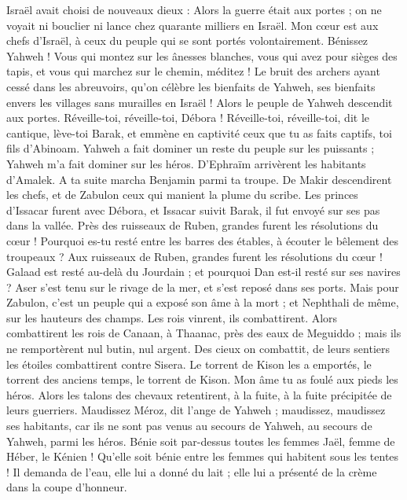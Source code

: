 \begin{multicols}{2}
Israël avait choisi de nouveaux dieux : Alors la guerre était aux portes ; on ne voyait ni bouclier ni lance chez quarante milliers en Israël.
Mon cœur est aux chefs d'Israël, à ceux du peuple qui se sont portés volontairement. Bénissez Yahweh !
Vous qui montez sur les ânesses blanches, vous qui avez pour sièges des tapis, et vous qui marchez sur le chemin, méditez !
Le bruit des archers ayant cessé dans les abreuvoirs, qu'on célèbre les bienfaits de Yahweh, ses bienfaits envers les villages sans murailles en Israël ! Alors le peuple de Yahweh descendit aux portes.
Réveille-toi, réveille-toi, Débora !  Réveille-toi, réveille-toi, dit le cantique, lève-toi Barak, et emmène en captivité ceux que tu as faits captifs, toi fils d'Abinoam.
Yahweh a fait dominer un reste du peuple sur les puissants ; Yahweh m'a fait dominer sur les héros.
D'Ephraïm arrivèrent les habitants d'Amalek. A ta suite marcha Benjamin parmi ta troupe. De Makir descendirent les chefs,  et de Zabulon ceux qui manient la plume du scribe.
Les princes d'Issacar furent avec Débora, et Issacar suivit Barak, il fut envoyé sur ses pas dans la vallée.  Près des ruisseaux de Ruben, grandes furent les résolutions du cœur !
Pourquoi es-tu resté entre les barres des étables, à écouter le bêlement des troupeaux ? Aux ruisseaux de Ruben, grandes furent les résolutions du cœur !
Galaad est resté au-delà du Jourdain ; et pourquoi Dan est-il resté sur ses navires ? Aser s'est tenu sur le rivage de la mer, et s’est reposé dans ses ports.
Mais pour Zabulon, c'est un peuple qui a exposé son âme à la mort ; et Nephthali de même, sur les hauteurs des champs.
Les rois vinrent,  ils combattirent. Alors combattirent les rois de Canaan, à Thaanac, près des eaux de Meguiddo ; mais ils ne remportèrent nul butin, nul argent.
Des cieux on combattit, de leurs sentiers les étoiles combattirent contre Sisera.
Le torrent de Kison les a emportés, le torrent des anciens temps, le torrent de Kison. Mon âme tu as foulé aux pieds les héros.
Alors les talons des chevaux retentirent, à la fuite, à la fuite précipitée de leurs guerriers.
Maudissez Méroz, dit l'ange de Yahweh ; maudissez, maudissez ses habitants, car ils ne sont pas venus au secours de Yahweh, au secours de Yahweh, parmi les héros.
Bénie soit par-dessus toutes les femmes Jaël, femme de Héber, le Kénien ! Qu'elle soit bénie entre les femmes qui habitent sous les tentes !
Il demanda de l'eau, elle lui a donné du lait ; elle lui a présenté de la crème dans la coupe d'honneur.

\end{multicols}
